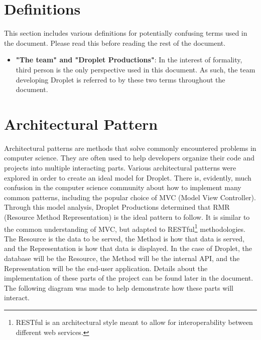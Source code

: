 \documentclass[draftclsnofoot, onecolumn, letterpaper,10pt,compsoc]{IEEEtran}
\begin{document}
\section{Definitions}
This section includes various definitions for potentially confusing terms used in the document. Please read this before reading the rest of the document.

\begin{itemize}
    \item \textbf{"The team" and "Droplet Productions"}: In the interest of formality, third person is the only perspective used in this document. As such, the team developing Droplet is referred to by these two terms throughout the document.
\end{itemize}

\newpage
\section{Architectural Pattern}

Architectural patterns are methods that solve commonly encountered problems in computer science. They are often used to help developers organize their code and projects into multiple interacting parts\cite{modelsdefined}. Various architectural patterns were explored in order to create an ideal model for Droplet. There is, evidently, much confusion in the computer science community about how to implement many common patterns, including the popular choice of MVC (Model View Controller)\cite{models}. Through this model analysis, Droplet Productions determined that RMR (Resource Method Representation) is the ideal pattern to follow. It is similar to the common understanding of MVC, but adapted to RESTful\footnote{RESTful is an architectural style meant to allow for interoperability between different web services.} methodologies. The Resource is the data to be served, the Method is how that data is served, and the Representation is how that data is displayed. In the case of Droplet, the database will be the Resource, the Method will be the internal API, and the Representation will be the end-user application. Details about the implementation of these parts of the project can be found later in the document. The following diagram was made to help demonstrate how these parts will interact. 
\end{document}
